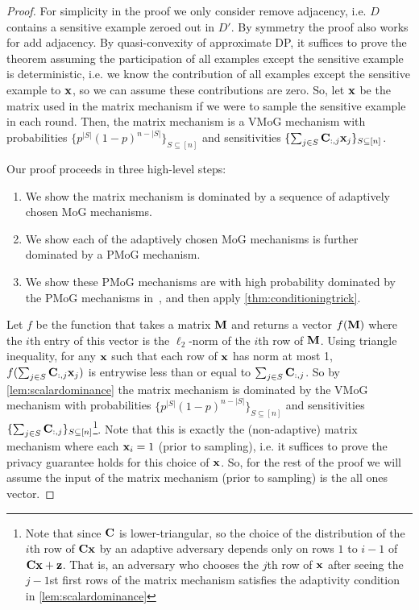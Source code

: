 \begin{proof}
For simplicity in the proof we only consider remove adjacency, i.e. $D$ contains a sensitive example zeroed out in $D'$. By symmetry the proof also works for add adjacency. By quasi-convexity of approximate DP, it suffices to prove the theorem assuming the participation of all examples except the sensitive example is deterministic, i.e. we know the contribution of all examples except the sensitive example to $\mathbf{x}$, so we can assume these contributions are zero. So, let $\mathbf{x}$ be the matrix used in the matrix mechanism if we were to sample the sensitive example in each round. Then, the matrix mechanism is a VMoG mechanism with probabilities $\{p^{|S|}(1-p)^{n - |S|}\}_{S \subseteq [n]}$ and sensitivities $\{\sum_{j \in S} \mathbf{C}_{:, j} \mathbf{x}_j\}_{S \subseteq [n]}$.

Our proof proceeds in three high-level steps: 
\begin{enumerate}
    \item We show the matrix mechanism is dominated by a sequence of adaptively chosen MoG mechanisms.
    \item We show each of the adaptively chosen MoG mechanisms is further dominated by a PMoG mechanism.
    \item We show these PMoG mechanisms are with high probability dominated by the PMoG mechanisms in~\CPTB{}, and then apply \cref{thm:conditioningtrick}. 
\end{enumerate}

Let $f$ be the function that takes a matrix $\mathbf{M}$ and returns a vector $f(\mathbf{M})$ where the $i$th entry of this vector is the $\ell_2$-norm of the $i$th row of $\mathbf{M}$. Using triangle inequality, for any $\mathbf{x}$ such that each row of $\mathbf{x}$ has norm at most 1, $f(\sum_{j \in S} \mathbf{C}_{:, j} \mathbf{x}_j)$ is entrywise less than or equal to $\sum_{j \in S} \mathbf{C}_{:, j}$. So by \cref{lem:scalardominance} the matrix mechanism is dominated by the VMoG mechanism with probabilities $\{p^{|S|}(1-p)^{n - |S|}\}_{S \subseteq [n]}$ and sensitivities $\{\sum_{j \in S} \mathbf{C}_{:, j}\}_{S \subseteq [n]}$\footnote{Note that since $\mathbf{C}$ is lower-triangular, so the choice of the distribution of the $i$th row of $\mathbf{C} \mathbf{x}$ by an adaptive adversary depends only on rows $1$ to $i-1$ of $\mathbf{C} \mathbf{x} + \mathbf{z}$. That is, an adversary who chooses the $j$th row of $\mathbf{x}$ after seeing the $j-1$st first rows of the matrix mechanism satisfies the adaptivity condition in \cref{lem:scalardominance}}. Note that this is exactly the (non-adaptive) matrix mechanism where each $\mathbf{x}_i = 1$ (prior to sampling), i.e. it suffices to prove the privacy guarantee holds for this choice of $\mathbf{x}$. So, for the rest of the proof we will assume the input of the matrix mechanism (prior to sampling) is the all ones vector.


\end{proof}
